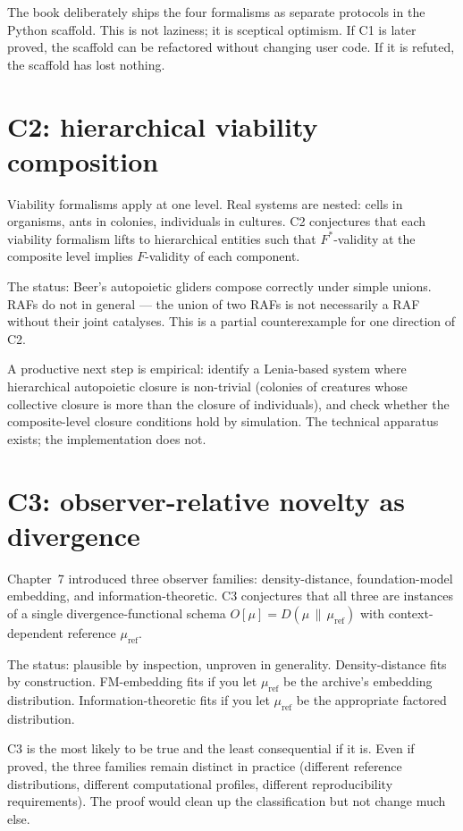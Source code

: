 The book deliberately ships the four formalisms as separate
protocols in the Python scaffold. This is not laziness; it is
sceptical optimism. If C1 is later proved, the scaffold can be
refactored without changing user code. If it is refuted, the
scaffold has lost nothing.

\section{C2: hierarchical viability composition}

Viability formalisms apply at one level. Real systems are nested:
cells in organisms, ants in colonies, individuals in cultures. C2
conjectures that each viability formalism lifts to hierarchical
entities such that $F^*$-validity at the composite level implies
$F$-validity of each component.

The status: Beer's autopoietic gliders compose correctly under
simple unions. RAFs do not in general --- the union of two RAFs is
not necessarily a RAF without their joint catalyses. This is a
partial counterexample for one direction of C2.

A productive next step is empirical: identify a Lenia-based system
where hierarchical autopoietic closure is non-trivial (colonies of
creatures whose collective closure is more than the closure of
individuals), and check whether the composite-level closure conditions
hold by simulation. The technical apparatus exists; the
implementation does not.

\section{C3: observer-relative novelty as divergence}

Chapter~7 introduced three observer families: density-distance,
foundation-model embedding, and information-theoretic. C3 conjectures
that all three are instances of a single divergence-functional schema
$O[\mu] = D(\mu \,\|\, \mu_{\mathrm{ref}})$ with context-dependent
reference $\mu_{\mathrm{ref}}$.

The status: plausible by inspection, unproven in generality.
Density-distance fits by construction. FM-embedding fits if you let
$\mu_{\mathrm{ref}}$ be the archive's embedding distribution.
Information-theoretic fits if you let $\mu_{\mathrm{ref}}$ be the
appropriate factored distribution.

C3 is the most likely to be true and the least consequential if it
is. Even if proved, the three families remain distinct in practice
(different reference distributions, different computational profiles,
different reproducibility requirements). The proof would clean up the
classification but not change much else.


